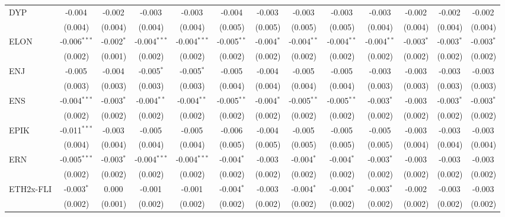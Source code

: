 \begin{table}[!htbp]
\begin{tabular}{@{\extracolsep{5pt}}lcccccccccccc}
 DYP & -0.004$^{}$ & -0.002$^{}$ & -0.003$^{}$ & -0.003$^{}$ & -0.004$^{}$ & -0.003$^{}$ & -0.003$^{}$ & -0.003$^{}$ & -0.003$^{}$ & -0.002$^{}$ & -0.002$^{}$ & -0.002$^{}$ \\
  & (0.004) & (0.004) & (0.004) & (0.004) & (0.005) & (0.005) & (0.005) & (0.005) & (0.004) & (0.004) & (0.004) & (0.004) \\
 ELON & -0.006$^{***}$ & -0.002$^{*}$ & -0.004$^{***}$ & -0.004$^{***}$ & -0.005$^{**}$ & -0.004$^{*}$ & -0.004$^{**}$ & -0.004$^{**}$ & -0.004$^{**}$ & -0.003$^{*}$ & -0.003$^{*}$ & -0.003$^{*}$ \\
  & (0.002) & (0.001) & (0.002) & (0.002) & (0.002) & (0.002) & (0.002) & (0.002) & (0.002) & (0.002) & (0.002) & (0.002) \\
 ENJ & -0.005$^{}$ & -0.004$^{}$ & -0.005$^{*}$ & -0.005$^{*}$ & -0.005$^{}$ & -0.004$^{}$ & -0.005$^{}$ & -0.005$^{}$ & -0.003$^{}$ & -0.003$^{}$ & -0.003$^{}$ & -0.003$^{}$ \\
  & (0.003) & (0.003) & (0.003) & (0.003) & (0.004) & (0.004) & (0.004) & (0.004) & (0.003) & (0.003) & (0.003) & (0.003) \\
 ENS & -0.004$^{***}$ & -0.003$^{*}$ & -0.004$^{**}$ & -0.004$^{**}$ & -0.005$^{**}$ & -0.004$^{*}$ & -0.005$^{**}$ & -0.005$^{**}$ & -0.003$^{*}$ & -0.003$^{}$ & -0.003$^{*}$ & -0.003$^{*}$ \\
  & (0.002) & (0.002) & (0.002) & (0.002) & (0.002) & (0.002) & (0.002) & (0.002) & (0.002) & (0.002) & (0.002) & (0.002) \\
 EPIK & -0.011$^{***}$ & -0.003$^{}$ & -0.005$^{}$ & -0.005$^{}$ & -0.006$^{}$ & -0.004$^{}$ & -0.005$^{}$ & -0.005$^{}$ & -0.005$^{}$ & -0.003$^{}$ & -0.003$^{}$ & -0.003$^{}$ \\
  & (0.004) & (0.004) & (0.004) & (0.004) & (0.005) & (0.005) & (0.005) & (0.005) & (0.005) & (0.004) & (0.004) & (0.004) \\
 ERN & -0.005$^{***}$ & -0.003$^{*}$ & -0.004$^{***}$ & -0.004$^{***}$ & -0.004$^{*}$ & -0.003$^{}$ & -0.004$^{*}$ & -0.004$^{*}$ & -0.003$^{*}$ & -0.003$^{}$ & -0.003$^{}$ & -0.003$^{}$ \\
  & (0.002) & (0.002) & (0.002) & (0.002) & (0.002) & (0.002) & (0.002) & (0.002) & (0.002) & (0.002) & (0.002) & (0.002) \\
 ETH2x-FLI & -0.003$^{*}$ & 0.000$^{}$ & -0.001$^{}$ & -0.001$^{}$ & -0.004$^{*}$ & -0.003$^{}$ & -0.004$^{*}$ & -0.004$^{*}$ & -0.003$^{*}$ & -0.002$^{}$ & -0.003$^{}$ & -0.003$^{}$ \\
  & (0.002) & (0.001) & (0.002) & (0.002) & (0.002) & (0.002) & (0.002) & (0.002) & (0.002) & (0.002) & (0.002) & (0.002) \\

\end{tabular}
\end{table}
